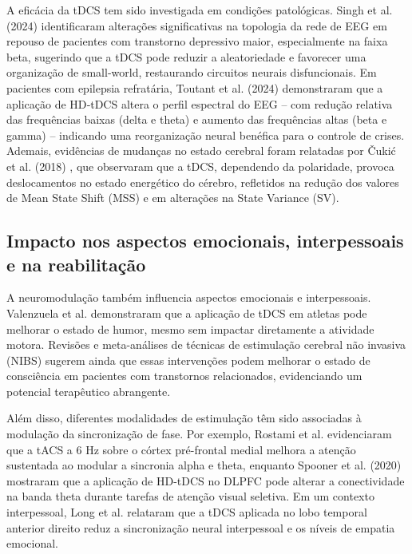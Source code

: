 A eficácia da tDCS tem sido investigada em condições patológicas. Singh et al. (2024) \cite{singh2024evaluating} identificaram alterações significativas na topologia da rede de EEG em repouso de pacientes com transtorno depressivo maior, especialmente na faixa beta, sugerindo que a tDCS pode reduzir a aleatoriedade e favorecer uma organização de small-world, restaurando circuitos neurais disfuncionais. Em pacientes com epilepsia refratária, Toutant et al. (2024) \cite{toutant2024hdtdcs} demonstraram que a aplicação de HD‑tDCS altera o perfil espectral do EEG – com redução relativa das frequências baixas (delta e theta) e aumento das frequências altas (beta e gamma) – indicando uma reorganização neural benéfica para o controle de crises. Ademais, evidências de mudanças no estado cerebral foram relatadas por Čukić et al. (2018) \cite{cukic2018shift}, que observaram que a tDCS, dependendo da polaridade, provoca deslocamentos no estado energético do cérebro, refletidos na redução dos valores de Mean State Shift (MSS) e em alterações na State Variance (SV).

\subsection{Impacto nos aspectos emocionais, interpessoais e na reabilitação}

A neuromodulação também influencia aspectos emocionais e interpessoais. Valenzuela et al. \cite{valenzuela2019enhancement} demonstraram que a aplicação de tDCS em atletas pode melhorar o estado de humor, mesmo sem impactar diretamente a atividade motora. Revisões e meta-análises de técnicas de estimulação cerebral não invasiva (NIBS) sugerem ainda que essas intervenções podem melhorar o estado de consciência em pacientes com transtornos relacionados, evidenciando um potencial terapêutico abrangente.

Além disso, diferentes modalidades de estimulação têm sido associadas à modulação da sincronização de fase. Por exemplo, Rostami et al. \cite{rostami2020transcranial} evidenciaram que a tACS a 6 Hz sobre o córtex pré-frontal medial melhora a atenção sustentada ao modular a sincronia alpha e theta, enquanto Spooner et al. (2020) \cite{spooner2020hdtdcs} mostraram que a aplicação de HD-tDCS no DLPFC pode alterar a conectividade na banda theta durante tarefas de atenção visual seletiva. Em um contexto interpessoal, Long et al. \cite{long2023transcranial} relataram que a tDCS aplicada no lobo temporal anterior direito reduz a sincronização neural interpessoal e os níveis de empatia emocional.

